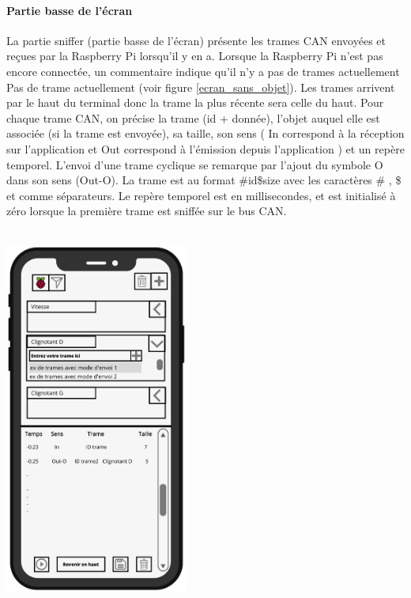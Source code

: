 \paragraph{Partie basse de l'écran}
La partie sniffer (partie basse de l'écran) présente les trames CAN envoyées et reçues par la Raspberry Pi lorsqu'il y en a. Lorsque la Raspberry Pi n'est pas encore connectée, un commentaire indique qu'il n'y a pas de trames actuellement {\guillemetleft} Pas de trame actuellement {\guillemetright} (voir figure \ref{ecran_sans_objet}). 
\newline
Les trames arrivent par le haut du terminal donc la trame la plus récente sera celle du haut. 
Pour chaque trame CAN, on précise la trame (id + donnée), l'objet auquel elle est associée (si la trame est envoyée), sa taille, son sens ({\guillemetleft} In {\guillemetright} correspond à la réception sur l'application {\nomApplication} et {\guillemetleft} Out {\guillemetright} correspond à l'émission depuis l'application {\nomApplication}) et un repère temporel. L'envoi d'une trame cyclique se remarque par l'ajout du symbole O dans son sens (Out-O).
La trame est au format {\guillemetleft} \#id\$size\@@message {\guillemetright} avec les caractères {\guillemetleft} \# {\guillemetright}, {\guillemetleft} \$ {\guillemetright} et {\guillemetleft} \@@ {\guillemetright} comme séparateurs.
\newline 
Le repère temporel est en millisecondes, et est initialisé à zéro lorsque la première trame est sniffée sur le bus CAN.
\\\\
\begin{minipage}{0.9\linewidth}
    \centering
    \includegraphics[width=0.45\textwidth]{sections/3_Exigences_specifiques/1_IHM/ihm/ecranPrincipalSelectionTrame.png}
    \label{ecran_sniffer_pause}
\end{minipage}\hfill

